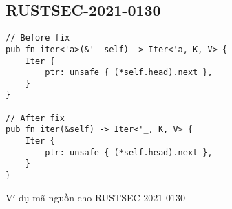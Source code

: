 \subsection{RUSTSEC-2021-0130}

\begin{listing}[H]
\begin{verbatim}
// Before fix
pub fn iter<'a>(&'_ self) -> Iter<'a, K, V> {
    Iter {
        ptr: unsafe { (*self.head).next },
    }
}

// After fix
pub fn iter(&self) -> Iter<'_, K, V> {
    Iter {
        ptr: unsafe { (*self.head).next },
    }
}
\end{verbatim}
\caption{Ví dụ mã nguồn cho RUSTSEC-2021-0130   }
\label{code:c4_RUSTSEC-2021-0130}
\end{listing}